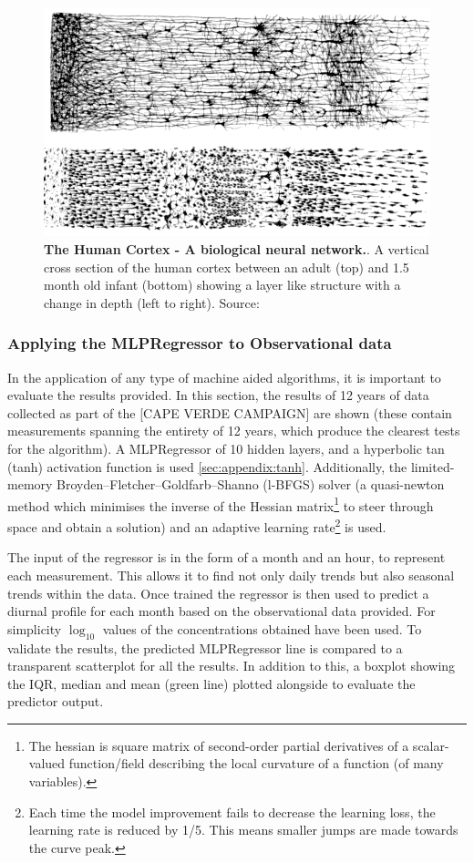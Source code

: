 \begin{figure}[H]
     \centering
         \includegraphics[width=.85\textwidth]{figures_c3/mlpregressor/Cajal_cortex_drawings.png}
        \caption{\textbf{The Human Cortex - A biological neural network.}. A vertical cross section of the human cortex between an adult (top) and 1.5 month old infant (bottom) showing a layer like structure with a change in depth (left to right). Source: \cite{layercortex}}
        \label{fig:layercortex}
\end{figure}

\subsubsection{Applying the MLPRegressor to Observational data}
In the application of any type of machine aided algorithms, it is important to evaluate the results provided. In this section, the results of 12 years of data collected as part of the [CAPE VERDE CAMPAIGN] are shown (these contain measurements spanning the entirety of 12 years, which produce the clearest tests for the algorithm). A MLPRegressor of 10 hidden layers, and a hyperbolic tan (tanh) activation function is used \autoref{sec:appendix:tanh}. Additionally, the limited-memory Broyden–Fletcher–Goldfarb–Shanno (l-BFGS) solver (a quasi-newton method which minimises the inverse of the Hessian matrix\footnote{ The hessian is square matrix of second-order partial derivatives of a scalar-valued function/field describing the local curvature of a function (of many variables).} to steer through space and obtain a solution) and an adaptive learning rate\footnote{Each time the model improvement fails to decrease the learning loss, the learning rate is reduced by 1/5. This means smaller jumps are made towards the curve peak. } is used. 

The input of the regressor is in the form of a month and an hour, to represent each measurement. This allows it to find not only daily trends but also seasonal trends within the data. Once trained the regressor is then used to predict a diurnal profile for each month based on the observational data provided. For simplicity $\log_{10}$ values of the concentrations obtained have been used. To validate the results, the predicted MLPRegressor line is compared to a transparent scatterplot for all the results. In addition to this, a boxplot showing the IQR, median and mean (green line) plotted alongside to evaluate the predictor output. 

